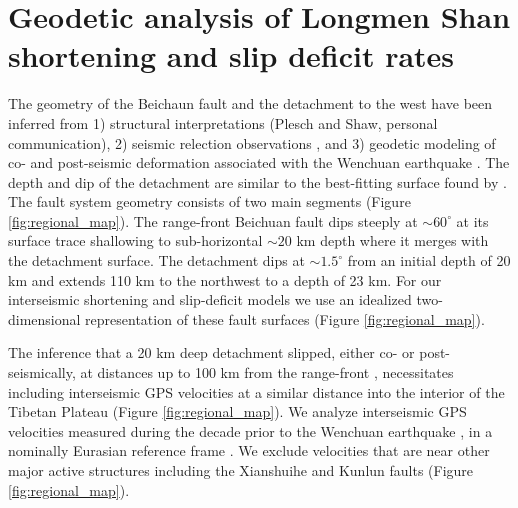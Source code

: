 \documentclass[12pt]{article}
\begin{document}
\section{Geodetic analysis of Longmen Shan shortening and slip deficit rates}
The geometry of the Beichaun fault and the detachment to the west have been inferred from 1) structural interpretations  \citep{Hubbard2010} (Plesch and Shaw, personal communication), 2) seismic relection observations \citep{Zhang2009, Guo2013}, and 3) geodetic modeling of co- and post-seismic deformation associated with the Wenchuan earthquake \citep{Qi2011, Fielding2013b}. The depth and dip of the detachment are similar to the best-fitting surface found by \citet{Qi2011}. The fault system geometry consists of two main segments (Figure \ref{fig:regional_map}). The range-front Beichuan fault dips steeply at ${\sim}60^{\circ}$ at its surface trace shallowing to sub-horizontal ${\sim}20$ km depth where it merges with the detachment surface. The detachment dips at ${\sim}1.5^{\circ}$ from an initial depth of 20 km and extends 110 km to the northwest to a depth of 23 km. For our interseismic shortening and slip-deficit models we use an idealized two-dimensional representation of these fault surfaces (Figure \ref{fig:regional_map}).

The inference that a 20 km deep detachment slipped, either co- or post-seismically, at distances up to 100 km from the range-front \citep{Qi2011}, necessitates including interseismic GPS velocities at a similar distance into the interior of the Tibetan Plateau (Figure \ref{fig:regional_map}). We analyze interseismic GPS velocities measured during the decade prior to the Wenchuan earthquake \citep{gan07}, in a nominally Eurasian reference frame \citep{apel06}. We exclude velocities that are near other major active structures including the Xianshuihe and Kunlun faults (Figure \ref{fig:regional_map}). 
\end{document}
